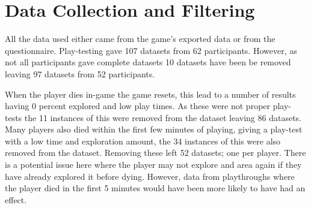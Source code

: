 \documentclass[journal]{IEEEtran}
\begin{document}
	\section{Data Collection and Filtering}  \label{datacollection}
	All the data used either came from the game's exported data or from the questionnaire.  Play-testing gave 107 datasets from 62 participants. However, as not all participants gave complete datasets 10 datasets have been be removed leaving 97 datasets from 52 participants. 
	
	When the player dies in-game the game resets, this lead to a number of results having 0 percent explored and low play times. As these were not proper play-tests the 11 instances of this were removed from the dataset leaving 86 datasets. Many players also died within the first few minutes of playing, giving a play-test with a low time and exploration amount, the 34 instances of this were also removed from the dataset. Removing these left 52 datasets; one per player. There is a potential issue here where the player may not explore and area again if they have already explored it before dying. However, data from playthroughs where the player died in the first 5 minutes would have been more likely to have had an effect. 
	
\end{document}

